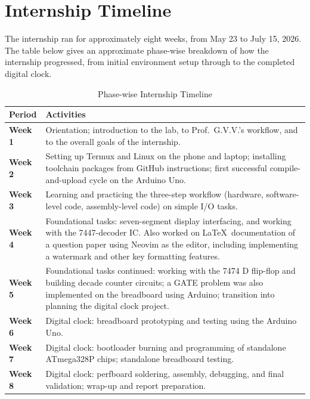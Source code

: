 \documentclass[12pt,a4paper]{report}
\begin{document}
\chapter{Internship Timeline}
\label{ch:timeline}
The internship ran for approximately eight weeks, from May 23 to July 15, 2026. The table below gives an approximate phase-wise breakdown of how the internship progressed, from initial environment setup through to the completed digital clock.
\begin{table}[H]
\centering
\caption{Phase-wise Internship Timeline}
\label{tab:timeline}
\begin{tabular}{@{}>{\bfseries}lp{10.8cm}@{}}
\toprule
Period & \textbf{Activities} \\
\midrule
Week 1 & Orientation; introduction to the lab, to Prof.\ G.V.V.'s workflow, and to the overall goals of the internship. \\
Week 2 & Setting up Termux and Linux on the phone and laptop; installing toolchain packages from GitHub instructions; first successful compile-and-upload cycle on the Arduino Uno. \\
Week 3 & Learning and practicing the three-step workflow (hardware, software-level code, assembly-level code) on simple I/O tasks. \\
Week 4 & Foundational tasks: seven-segment display interfacing, and working with the 7447-decoder IC. Also worked on \LaTeX\ documentation of a question paper using Neovim as the editor, including implementing a watermark and other key formatting features. \\
Week 5 & Foundational tasks continued: working with the 7474 D flip-flop and building decade counter circuits; a GATE problem was also implemented on the breadboard using Arduino; transition into planning the digital clock project. \\
Week 6 & Digital clock: breadboard prototyping and testing using the Arduino Uno. \\
Week 7 & Digital clock: bootloader burning and programming of standalone ATmega328P chips; standalone breadboard testing. \\
Week 8 & Digital clock: perfboard soldering, assembly, debugging, and final validation; wrap-up and report preparation. \\
\bottomrule
\end{tabular}
\end{table}
\end{document}

